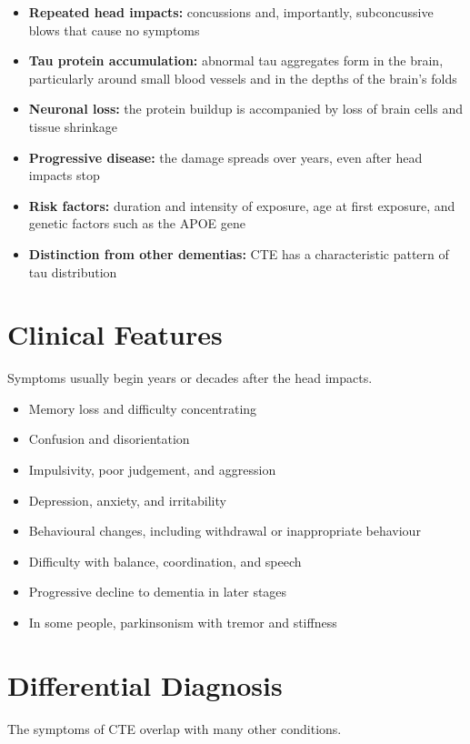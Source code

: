 \begin{itemize}
    \item \textbf{Repeated head impacts:} concussions and, importantly, subconcussive blows that cause no symptoms
    \item \textbf{Tau protein accumulation:} abnormal tau aggregates form in the brain, particularly around small blood vessels and in the depths of the brain's folds
    \item \textbf{Neuronal loss:} the protein buildup is accompanied by loss of brain cells and tissue shrinkage
    \item \textbf{Progressive disease:} the damage spreads over years, even after head impacts stop
    \item \textbf{Risk factors:} duration and intensity of exposure, age at first exposure, and genetic factors such as the APOE gene
    \item \textbf{Distinction from other dementias:} CTE has a characteristic pattern of tau distribution
\end{itemize}

\section*{Clinical Features}
Symptoms usually begin years or decades after the head impacts.

\begin{itemize}
    \item Memory loss and difficulty concentrating
    \item Confusion and disorientation
    \item Impulsivity, poor judgement, and aggression
    \item Depression, anxiety, and irritability
    \item Behavioural changes, including withdrawal or inappropriate behaviour
    \item Difficulty with balance, coordination, and speech
    \item Progressive decline to dementia in later stages
    \item In some people, parkinsonism with tremor and stiffness
\end{itemize}

\section*{Differential Diagnosis}
The symptoms of CTE overlap with many other conditions.

